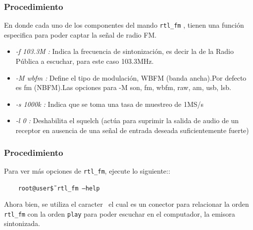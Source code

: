 \begin{frame}
\frametitle{Procedimiento}

En donde cada uno de los componentes del mando \texttt{rtl\_fm} , tienen una función especifica para poder captar la señal de radio FM.

\begin{itemize}
    \item {\textit{-f 103.3M : } Indica la frecuencia de sintonización, es decir la de la Radio Pública a escuchar, para este caso 103.3MHz.}
    \item {\textit{-M wbfm :} Define el tipo de modulación, WBFM (banda ancha).Por defecto es fm (NBFM).Las opciones para -M son, fm, wbfm, raw, am, usb, lsb.}
    \item {\textit{-s 1000k :} Indica que se toma una tasa de muestreo de 1MS/s}
    \item {\textit{-l 0 :} Deshabilita el squelch (actúa para suprimir la salida de audio de un receptor en ausencia de una señal de entrada deseada suficientemente fuerte)}
\end{itemize}

\end{frame}

\begin{frame}
\frametitle{Procedimiento}

Para ver más opciones de \texttt{rtl\_fm}, ejecute lo siguiente::

\begin{block}{}
  \texttt{
  \ \ \ root@user\~\$ rtl\_fm --help}
\end{block} 

Ahora bien, se utiliza el caracter \textbar  \ el cual es un conector para relacionar la orden \texttt{rtl\_fm} con la orden \texttt{play} para poder escuchar en el computador, la emisora sintonizada.


\end{frame}

